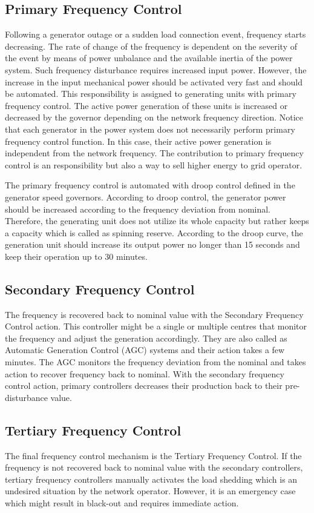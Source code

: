 \subsection{Primary Frequency Control}
Following a generator outage or a sudden load connection event, frequency starts decreasing. The rate of change of the frequency is dependent on the severity of the event by means of power unbalance and the available inertia of the power system. Such frequency disturbance requires increased input power. However, the increase in the input mechanical power should be activated very fast and should be automated. This responsibility is assigned to generating units with primary frequency control. The active power generation of these units is increased or decreased by the governor depending on the network frequency direction. Notice that each generator in the power system does not necessarily perform primary frequency control function. In this case, their active power generation is independent from the network frequency. The contribution to primary frequency control is an responsibility but also a way to sell higher energy to grid operator.\par
The primary frequency control is automated with droop control defined in the generator speed governors. According to droop control, the generator power should be increased according to the frequency deviation from nominal. Therefore, the generating unit does not utilize its whole capacity but rather keeps a capacity which is called as spinning reserve. According to the droop curve, the generation unit should increase its output power no longer than 15 seconds and keep their operation up to 30 minutes\cite{Machowski2011}.
\subsection{Secondary Frequency Control}
The frequency is recovered back to nominal value with the Secondary Frequency Control action. This controller might be a single or multiple centres that monitor the frequency and adjust the generation accordingly. They are also called as Automatic Generation Control (AGC) systems and their action takes a few minutes. The AGC monitors the frequency deviation from the nominal and takes action to recover frequency back to nominal. With the secondary frequency control action, primary controllers decreases their production back to their pre-disturbance value.
\subsection{Tertiary Frequency Control}
The final frequency control mechanism is the Tertiary Frequency Control. If the frequency is not recovered back to nominal value with the secondary controllers, tertiary frequency controllers manually activates the load shedding which is an undesired situation by the network operator. However, it is an emergency case which might result in black-out and requires immediate action.
